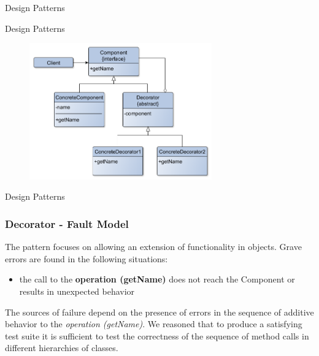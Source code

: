 \documentclass{beamer}
\begin{document}
\begin{section}{Design Patterns}
\begin{subsection}{Design Patterns}
\begin{frame}
\begin{figure}[!h]
	\centering
	\includegraphics[width=0.7\textwidth]{./Decorator/ClassDiagram.png}	
	\label{DeclassDiag}
\end{figure} 
		
	\end{frame}
\end{subsection}

\begin{subsection}{Design Patterns}
	\begin{frame}
		\frametitle{Decorator - Fault Model}
		
		The pattern focuses on allowing an extension of functionality in objects. Grave errors are found in the following situations:  
		\begin{itemize}
			\item the call to the \textbf{operation (getName)} does not reach the Component or results in unexpected behavior
		\end{itemize}
		\vspace{5mm}
	The sources of failure depend on the presence of errors in the sequence of additive behavior to the \textit{operation (getName)}. We reasoned that to produce a satisfying test suite it is sufficient to test the correctness of the sequence of method calls in different hierarchies of classes.
		
	\end{frame}
\end{subsection}


\end{section}
\end{document}
